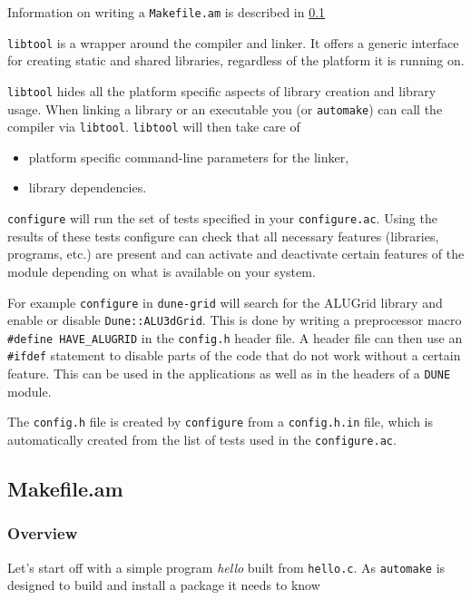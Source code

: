 \documentclass[11pt,a4paper,headinclude,footinclude,DIV16,normalheadings]{scrartcl}
\newcommand{\dune}{\texttt{DUNE}\xspace}
\newcommand{\automake}{\texttt{automake}\xspace}
\newcommand{\libtool}{\texttt{libtool}\xspace}
\newcommand{\configure}{\texttt{configure}\xspace}
\newcommand{\configureac}{\texttt{configure.ac}\xspace}
\newcommand{\makefileam}{\texttt{Makefile.am}\xspace}
\newcommand{\dunegrid}{\texttt{dune-grid}\xspace}
\newcommand{\executable}[1]{{\em #1}\xspace}
\begin{document}
Information on writing a \makefileam is described in \ref{makefile.am}

\libtool is a wrapper around the compiler and
linker. It offers a generic interface for creating static and shared
libraries, regardless of the platform it is running on.

\libtool hides all the platform specific aspects of library creation
and library usage. When linking a library or an executable you (or
\automake) can call the compiler via \libtool. \libtool will then take
care of
\begin{itemize}
\item platform specific command-line parameters for the linker,
\item library dependencies.
\end{itemize}

\label{configure}
\configure will run the set of tests specified in your \configureac.
Using the results of these tests configure can check that all
necessary features (libraries, programs, etc.) are present and can activate
and deactivate certain features of the module depending on what is
available on your system.

For example \configure in \dunegrid will search for the ALUGrid
library and  enable or disable \texttt{Dune::ALU3dGrid}.
This is done by writing a preprocessor macro \verb!#define HAVE_ALUGRID!
in the \texttt{config.h}
header file. A header file can then use an \verb!#ifdef! statement to
disable parts of the code that do not work without a certain
feature. This can be used in the applications as well as in the headers
of a \dune module.

The \texttt{config.h} file is created by \configure from a
\texttt{config.h.in} file, which is automatically created from the
list of tests used in the \configureac.

\subsection{Makefile.am}
\label{makefile.am}

\subsubsection{Overview}

Let's start off with a simple program \executable{hello} built from
\texttt{hello.c}. As \automake is designed to build and install a
package it needs to know
\end{document}
